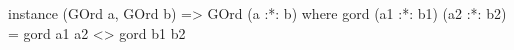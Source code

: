 \begin{code}
instance (GOrd a, GOrd b) => GOrd (a :*: b) where
  gord (a1 :*: b1) (a2 :*: b2) = gord a1 a2 <> gord b1 b2
\end{code}
